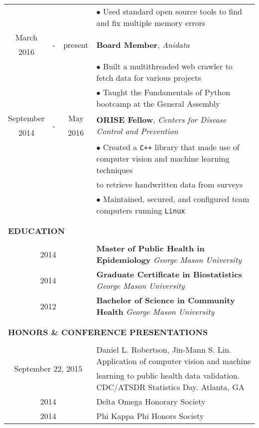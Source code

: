 \documentclass[10pt]{article}
\begin{document}
\begin{table}[ht]
\begin{tabular}{@{\hspace{0mm}}c@{\hspace{1mm}}c@{\hspace{3mm}}cl}
            & & & $\bullet$ Used standard open source tools to find and fix multiple memory errors\\
            March & \multirow{2}{*}{-} & \multirow{2}{*}{present} & \multirow{2}{*}{\textbf{Board Member}, \textit{Anidata}}\\
            2016 & & &\\
            & & & $\bullet$ Built a multithreaded web crawler to fetch data for various projects\\
            & & & $\bullet$ Taught the Fundamentals of Python bootcamp at the General Assembly\\
            September & \multirow{2}{*}{-} & May & \multirow{2}{*}{\textbf{ORISE Fellow}, \textit{Centers for Disease Control and Prevention}}\\
            2014 & & 2016 &\\
            & & & $\bullet$ Created a \texttt{C++} library that made use of computer vision and machine learning techniques\\
            & & & \hspace*{4mm}to retrieve handwritten data from surveys\\
            & & & $\bullet$ Maintained, secured, and configured team computers running \texttt{Linux}\\\\[-2mm]
            \hline\\[-3mm]
            \multicolumn{4}{l}{\large{\textbf{EDUCATION}}}\\
            \hline\\[-2mm]
            \multicolumn{3}{c}{2014} & \textbf{Master of Public Health in Epidemiology} \textit{George Mason University}\\[1mm]
            \multicolumn{3}{c}{2014} & \textbf{Graduate Certificate in Biostatistics} \textit{George Mason University}\\[1mm]
            \multicolumn{3}{c}{2012} & \textbf{Bachelor of Science in Community Health} \textit{George Mason University}\\\\[-2mm]
            \hline\\[-3mm]
            \multicolumn{4}{l}{\large{\textbf{HONORS \& CONFERENCE PRESENTATIONS}}}\\
            \hline\\[-2mm]
            \multicolumn{3}{c}{\multirow{2}{*}{September 22, 2015}} & Daniel L. Robertson, Jin-Mann S. Lin. Application of computer vision and machine\\
            & & & learning to public health data validation. CDC/ATSDR Statistics Day. Atlanta, GA\\
            \multicolumn{3}{c}{2014} & Delta Omega Honorary Society\\
            \multicolumn{3}{c}{2014} & Phi Kappa Phi Honors Society\\
        \end{tabular}
    \end{table}
\end{document}
